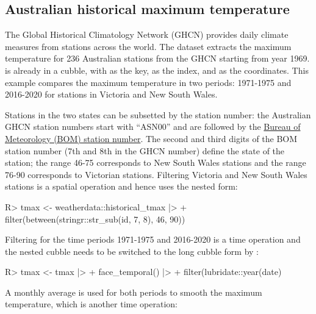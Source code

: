 \documentclass[
]{jss}
\begin{document}
\hypertarget{australian-historical-maximum-temperature}{%
\subsection{Australian historical maximum temperature}\label{australian-historical-maximum-temperature}}

The Global Historical Climatology Network (GHCN) provides daily climate measures from stations across the world. The dataset  extracts the maximum temperature for 236 Australian stations from the GHCN starting from year 1969.  is already in a cubble, with  as the key,  as the index, and  as the coordinates. This example compares the maximum temperature in two periods: 1971-1975 and 2016-2020 for stations in Victoria and New South Wales.

Stations in the two states can be subsetted by the station number: the Australian GHCN station numbers start with ``ASN00'' and are followed by the \href{http://www.bom.gov.au/climate/cdo/about/site-num.shtml}{Bureau of Meteorology (BOM) station number}. The second and third digits of the BOM station number (7th and 8th in the GHCN number) define the state of the station; the range 46-75 corresponds to New South Wales stations and the range 76-90 corresponds to Victorian stations. Filtering Victoria and New South Wales stations is a spatial operation and hence uses the nested form:

\begin{CodeChunk}
\begin{CodeInput}
R> tmax <- weatherdata::historical_tmax |>
+   filter(between(stringr::str_sub(id, 7, 8), 46, 90))
\end{CodeInput}
\end{CodeChunk}

Filtering for the time periods 1971-1975 and 2016-2020 is a time operation and the nested cubble needs to be switched to the long cubble form by :

\begin{CodeChunk}
\begin{CodeInput}
R> tmax <- tmax |>
+   face_temporal() |>
+   filter(lubridate::year(date) %
\end{CodeInput}
\end{CodeChunk}

A monthly average is used for both periods to smooth the maximum temperature, which is another time operation:
\end{document}
